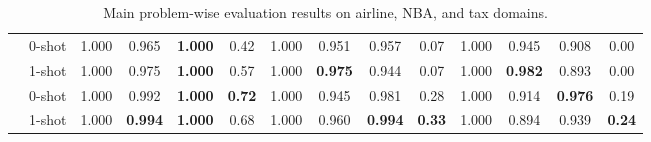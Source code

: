 \documentclass[letterpaper]{article} %
\begin{document}
\begin{table*}[t]
{\begin{tabular}{l c cccccccccccc}
\hdashline
\multirow{2}{*}{GPT-4o} & 0-shot & 1.000 & 0.965 & \colorbox{mywheat}{\textbf{1.000}} & 0.42 & 1.000 & 0.951 & 0.957 & 0.07 & 1.000 & \colorbox{mylightblue}{0.945} & 0.908 & 0.00 \\
& 1-shot & 1.000 & 0.975 & \colorbox{mywheat}{\textbf{1.000}} & 0.57 & 1.000 & \colorbox{mywheat}{\textbf{0.975}} & 0.944 & 0.07 & 1.000 & \colorbox{mywheat}{\textbf{0.982}} & 0.893 & 0.00 \\
\hdashline
\multirow{2}{*}{o1-preview} & 0-shot & 1.000 & \colorbox{mylightblue}{0.992} & \colorbox{mywheat}{\textbf{1.000}} & \colorbox{mywheat}{\textbf{0.72}} & 1.000 & 0.945 & \colorbox{mylightblue}{0.981} & \colorbox{mylightblue}{0.28} & 1.000 & 0.914 & \colorbox{mywheat}{\textbf{0.976}} & \colorbox{mylightblue}{0.19} \\
& 1-shot & 1.000 & \colorbox{mywheat}{\textbf{0.994}} & \colorbox{mywheat}{\textbf{1.000}} & \colorbox{mylightblue}{0.68} & 1.000 & \colorbox{mylightblue}{0.960} & \colorbox{mywheat}{\textbf{0.994}} & \colorbox{mywheat}{\textbf{0.33}} & 1.000 & 0.894 & \colorbox{mylightblue}{0.939} & \colorbox{mywheat}{\textbf{0.24}} \\
\bottomrule
\end{tabular}}
    \vspace{-4pt}
    \caption{Main problem-wise evaluation results on airline, NBA, and tax domains.}
\end{table*}
\end{document}
